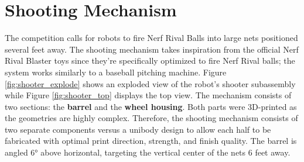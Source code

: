 \section{Shooting Mechanism}
The competition calls for robots to fire Nerf Rival Balls into large nets positioned several feet away. The shooting mechanism takes inspiration from the official Nerf Rival Blaster toys since they're specifically optimized to fire Nerf Rival balls; the system works similarly to a baseball pitching machine. Figure \ref{fig:shooter_explode} shows an exploded view of the robot's shooter subassembly while Figure \ref{fig:shooter_top} displays the top view. The mechanism consists of two sections: the \textbf{barrel} and the \textbf{wheel housing}. Both parts were 3D-printed as the geometries are highly complex. Therefore, the shooting mechanism consists of two separate components versus a unibody design to allow each half to be fabricated with optimal print direction, strength, and finish quality. The barrel is angled \ang{6} above horizontal, targeting the vertical center of the nets 6 feet away.

